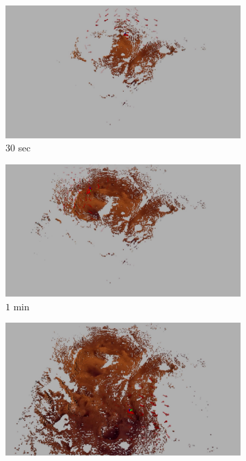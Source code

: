 \documentclass[conf]{new-aiaa}
\begin{document}
\begin{figure}[!t]
	\centering
	\begin{subfigure}[t]{0.49\columnwidth}
           	\centering
          	\includegraphics[height=0.5\textwidth]{RdcdMarsMap30sec.jpg}
        		\caption{$30$ sec}
		\vspace*{0.025\textwidth}
    	\end{subfigure}
    	\begin{subfigure}[t]{0.49\columnwidth}
           	\centering
          	\includegraphics[height=0.5\textwidth]{RdcdMarsMap1min.jpg}
        		\caption{$1$ min}
		\vspace*{0.025\textwidth}
    	\end{subfigure}
	\centering
	\begin{subfigure}[t]{0.49\columnwidth}
           	\centering
          	\includegraphics[height=0.5\textwidth]{RdcdMarsMap2min.jpg}

\end{subfigure}
\end{figure}
\end{document}
